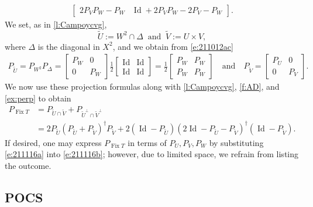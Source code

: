 \documentclass[11pt]{article}
\newcommand{\Fix}{\ensuremath{\operatorname{Fix}}}
\newcommand{\Id}{\ensuremath{\operatorname{Id}}}
\theoremstyle{definition}
\providecommand{\Id}{\operatorname{{ Id}}}
\providecommand{\Id}{\operatorname{Id}}
\begin{document}
{\begin{subequations}
\begin{align}
\begin{bmatrix}
2P_VP_W- P_W&\Id+2P_VP_W-2P_V-P_W
\end{bmatrix}. 
\end{align}
\end{subequations}
We set, as in \cref{l:Campoycvg}, 
\begin{equation*}
\widetilde{U} := W^2 \cap \Delta
\;\;\text{and}\;\;
\widetilde{V} := U\times V,
\end{equation*}
where $\Delta$ is the diagonal in $X^2$, and we obtain from \cref{e:211012ac}
\begin{align}
\label{e:211116a}
P_{\widetilde{U}}=
P_{W^2}P_\Delta = 
\begin{bmatrix}
P_W & 0 \\ 0 & P_W
\end{bmatrix}
\frac{1}{2}
\begin{bmatrix}
\Id & \Id \\ \Id & \Id 
\end{bmatrix}
=\frac{1}{2}
\begin{bmatrix}
P_W & P_W \\ P_W & P_W
\end{bmatrix}
\quad\text{and}\quad P_{\widetilde{V}}=\begin{bmatrix}
P_U & 0 \\ 0 & P_V
\end{bmatrix}.
\end{align}
We now use these projection formulas along with 
\cref{l:Campoycvg}, \cref{f:AD}, and \cref{ex:perp} to obtain 
\begin{subequations}
\label{e:211116b}
\begin{align}
P_{\Fix T}&=P_{\widetilde{U}\cap \widetilde{V}}+
P_{\widetilde{U}^\perp\cap \widetilde{V}^\perp}\\
&=2P_{\widetilde{U}}(P_{\widetilde{U}}+P_{\widetilde{V}})^\dagger P_{\widetilde{V}}+
2(\Id-P_{\widetilde{U}})(2\Id-P_{\widetilde{U}} -P_{\widetilde{V}})^\dagger
(\Id-P_{\widetilde{V}}). 
\end{align}
\end{subequations}
If desired, one may express $P_{\Fix T}$ in terms of $P_U,P_V,P_W$ 
by substituting \cref{e:211116a} into \cref{e:211116b}; 
however, due to limited space, we refrain from listing the outcome. 

{\color{black}
\subsection{POCS}

}}
\end{document}
